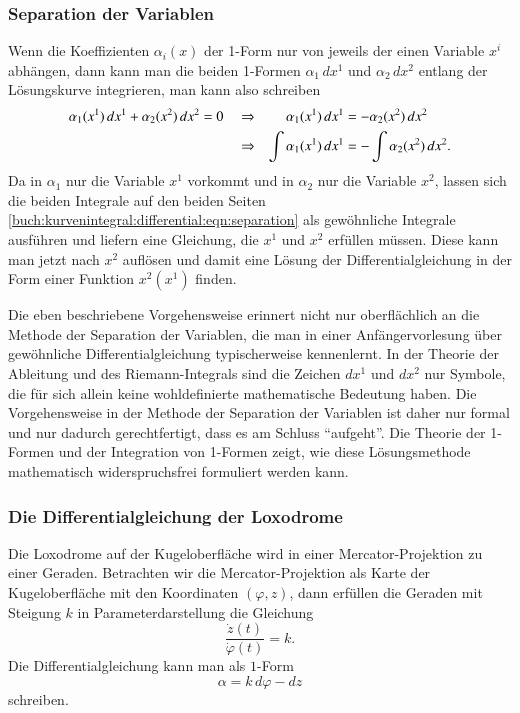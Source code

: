%
%
\subsubsection{Separation der Variablen}
Wenn die Koeffizienten $\alpha_i(x)$ der 1-Form nur von jeweils der einen
Variable $x^i$ abhängen, dann kann man die beiden 1-Formen
$\alpha_1\,dx^1$ und $\alpha_2\,dx^2$ entlang der Lösungskurve
integrieren, man kann also schreiben
\begin{align}
\alpha_1(x^1)\,dx^1
+
\alpha_2(x^2)\,dx^2
&=0
&&\Rightarrow&
\alpha_1(x^1)\,dx^1
&=
-
\alpha_2(x^2)\,dx^2
\notag
\\
&
&&\Rightarrow&
\int \alpha_1(x^1)\,dx^1
&=
-\int \alpha_2(x^2)\,dx^2.
\label{buch:kurvenintegral:differential:eqn:separation}
\end{align}
Da in $\alpha_1$ nur die Variable $x^1$ vorkommt und in $\alpha_2$
nur die Variable $x^2$, lassen sich die beiden Integrale auf den
beiden Seiten \eqref{buch:kurvenintegral:differential:eqn:separation}
als gewöhnliche Integrale ausführen und liefern eine Gleichung,
die $x^1$ und $x^2$ erfüllen müssen.
Diese kann man jetzt nach $x^2$ auflösen und damit eine Lösung der
Differentialgleichung in der Form einer Funktion $x^2(x^1)$ finden.

Die eben beschriebene Vorgehensweise erinnert nicht nur oberflächlich
an die Methode der Separation der Variablen, die man in einer
Anfängervorlesung über gewöhnliche Differentialgleichung typischerweise
kennenlernt.
In der Theorie der Ableitung und des Riemann-Integrals sind die Zeichen
$dx^1$ und $dx^2$ nur Symbole, die für sich allein keine
wohldefinierte mathematische Bedeutung haben.
Die Vorgehensweise in der Methode der Separation der Variablen ist
daher nur formal und nur dadurch gerechtfertigt, dass es am Schluss
``aufgeht''.
Die Theorie der 1-Formen und der Integration von 1-Formen zeigt,
wie diese Lösungsmethode mathematisch widerspruchsfrei formuliert
werden kann.

%
%
\subsubsection{Die Differentialgleichung der Loxodrome}
Die Loxodrome auf der Kugeloberfläche wird in einer Mercator-Projektion
zu einer Geraden.
Betrachten wir die Mercator-Projektion als Karte der Kugeloberfläche
mit den Koordinaten $(\varphi,z)$, dann erfüllen die Geraden mit
Steigung $k$ in Parameterdarstellung die Gleichung
\[
\frac{\dot{z}(t)}{\dot{\varphi}(t)}
=
k.
\]
Die Differentialgleichung kann man als $1$-Form 
\begin{equation}
\alpha
=
k\,d\varphi - dz
\label{buch:kurvenintegral:differential:mercatorform}
\end{equation}
schreiben.

